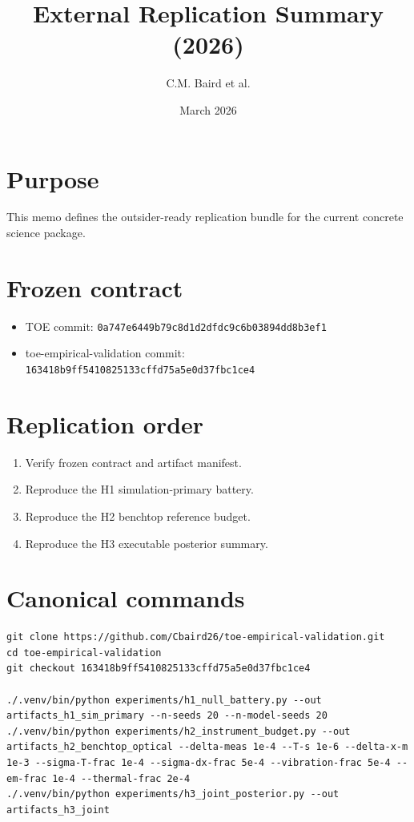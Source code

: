 \documentclass[11pt]{article}
\title{External Replication Summary (2026)}
\author{C.M. Baird et al.}
\date{March 2026}
\begin{document}
\maketitle

\section*{Purpose}
This memo defines the outsider-ready replication bundle for the current concrete science package.

\section*{Frozen contract}
\begin{itemize}
    \item TOE commit: \texttt{0a747e6449b79c8d1d2dfdc9c6b03894dd8b3ef1}
    \item toe-empirical-validation commit: \texttt{163418b9ff5410825133cffd75a5e0d37fbc1ce4}
\end{itemize}

\section*{Replication order}
\begin{enumerate}
    \item Verify frozen contract and artifact manifest.
    \item Reproduce the H1 simulation-primary battery.
    \item Reproduce the H2 benchtop reference budget.
    \item Reproduce the H3 executable posterior summary.
\end{enumerate}

\section*{Canonical commands}
\begin{verbatim}
git clone https://github.com/Cbaird26/toe-empirical-validation.git
cd toe-empirical-validation
git checkout 163418b9ff5410825133cffd75a5e0d37fbc1ce4

./.venv/bin/python experiments/h1_null_battery.py --out artifacts_h1_sim_primary --n-seeds 20 --n-model-seeds 20
./.venv/bin/python experiments/h2_instrument_budget.py --out artifacts_h2_benchtop_optical --delta-meas 1e-4 --T-s 1e-6 --delta-x-m 1e-3 --sigma-T-frac 1e-4 --sigma-dx-frac 5e-4 --vibration-frac 5e-4 --em-frac 1e-4 --thermal-frac 2e-4
./.venv/bin/python experiments/h3_joint_posterior.py --out artifacts_h3_joint
\end{verbatim}
\end{document}
